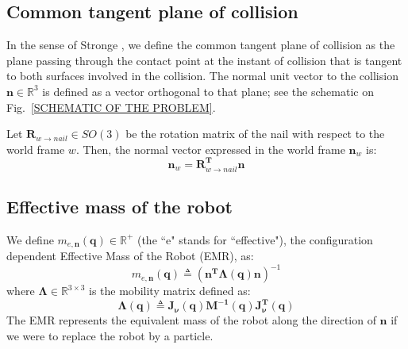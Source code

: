 \documentclass[conference]{IEEEtran}
\begin{document}
\subsection{Common tangent plane of collision}
\noindent
In the sense of Stronge \cite{STRONGE}, we define the common tangent plane of collision as the plane passing through the contact point at the instant of collision that is tangent to both surfaces involved in the collision.
The normal unit vector to the collision $\mathbf{n} \in \mathbb{R}^3$ is defined as a vector orthogonal to that plane; see the schematic on Fig.~\ref{SCHEMATIC OF THE PROBLEM}.

Let $\mathbf{R}_{w \to nail} \in SO(3)$ be the rotation matrix of the nail with respect to the world frame $w$. Then, the normal vector expressed in the world frame $\mathbf{n}_w$ is:
\begin{equation}
    \mathbf{n}_w = \mathbf{R}_{w \to nail}^{\mathbf{T}} \mathbf{n}
\end{equation}
\subsection{Effective mass of the robot}
\noindent
We define $m_{e,\mathbf{n}}(\mathbf{q}) \in \mathbb{R^+}$ (the ``e" stands for ``effective"), the configuration dependent Effective Mass of the Robot (EMR), as:
\begin{equation}
    m_{e,\mathbf{n}}(\mathbf{q}) \triangleq \left(\mathbf{n^T} \bm \Lambda (\mathbf{q}) \mathbf{n} \right)^{-1}
\label{effective mass}
\end{equation}
where $\bm \Lambda \in \mathbb{R}^{3 \times 3}$ is the mobility matrix \cite{cisnerosImpulsivePedipulationSpherical2016} defined as:
\begin{equation}
    \bm \Lambda(\mathbf{q}) \triangleq \mathbf{J_\nu(\mathbf{q}) M^{-1}(\mathbf{q})J_\nu^T(q)}
\end{equation}
The EMR represents the equivalent mass of the robot along the direction of $\mathbf{n}$ if we were to replace the robot by a particle.
\end{document}
